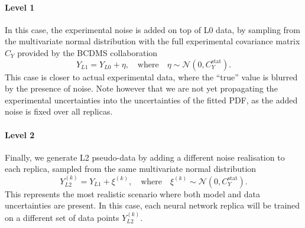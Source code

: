 \paragraph{Level 1}
In this case, the experimental noise is added on top of L0 data, by sampling from the
multivariate normal distribution with the full experimental covariance matrix
$C_Y$ provided by the BCDMS collaboration
\begin{equation}
Y_{L1} =  Y_{L0} + \eta, \quad \textrm{where} \quad \eta \sim \mathcal{N}(0, C_Y^{\text{stat}}).
\end{equation}
This case is closer to actual experimental data, where the ``true'' value is
blurred by the presence of noise. Note however that we are not yet propagating
the experimental uncertainties into the uncertainties of the fitted PDF, as the added
noise is fixed over all replicas.

\paragraph{Level 2}
Finally, we generate L2 pseudo-data by adding a different noise realisation to each
replica, sampled from the same multivariate normal distribution
\begin{equation}
Y_{L2}^{(k)} =  Y_{L1} + \xi^{(k)}, \quad \textrm{where} \quad \xi^{(k)} \sim \mathcal{N}(0, C_Y^{\text{stat}}).
\end{equation}
This represents the most realistic scenario where both model and data uncertainties
are present. In this case, each neural network replica will be trained on a
different set of data points $Y_{L2}^{(k)}$.
